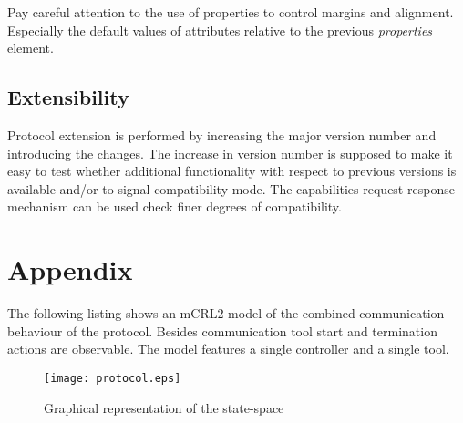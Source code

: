 \documentclass{article}
\begin{document}
  \noindent Pay careful attention to the use of properties to control margins and
  alignment. Especially the default values of attributes relative to the
  previous \textit{properties} element.

  \subsection{Extensibility}

   Protocol extension is performed by increasing the major version number and
   introducing the changes. The increase in version number is supposed to make
   it easy to test whether additional functionality with respect to previous
   versions is available and/or to signal compatibility mode. The capabilities
   request-response mechanism can be used check finer degrees of compatibility.
   
  \enlargethispage*{4pt}
  

  \section{Appendix}
  \pagestyle{empty}

  The following listing shows an mCRL2 model of the combined communication
  behaviour of the protocol. Besides communication tool start and termination
  actions are observable. The model features a single controller and a single
  tool.

  \addtolength{\oddsidemargin}{-2cm}
  \addtolength{\evensidemargin}{-2cm}
  \addtolength{\textwidth}{4cm}
  \small  \normalsize

  \pagebreak
  \addtolength{\oddsidemargin}{2cm}
  \addtolength{\evensidemargin}{2cm}

  \begin{figure}[H]
   \texttt{[image: protocol.eps]}
   \caption{Graphical representation of the state-space}
  \end{figure}


   
\end{document}
